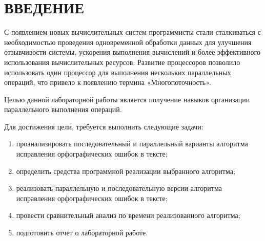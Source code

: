 \chapter*{\hfill{\centering ВВЕДЕНИЕ}\hfill}

С появлением новых вычислительных систем программисты стали сталкиваться с необходимостью проведения одновременной обработки данных для улучшения отзывчивости системы, ускорения выполнения вычислений и более эффективного использования вычислительных ресурсов.
Развитие процессоров позволило использовать один процессор для выполнения нескольких параллельных операций, что привело к появлению термина «Многопоточность».

Целью данной лабораторной работы является получение навыков организации параллельного выполнения операций.

Для достижения цели, требуется выполнить следующие задачи:
\begin{enumerate}[label={\arabic*)}]
	\item проанализировать последовательный и параллельный варианты алгоритма исправления орфографических ошибок в тексте;
	\item определить средства программной реализации выбранного алгоритма;
	\item реализовать параллельную и последовательную версии алгоритма исправления орфографических ошибок в тексте;
	\item провести сравнительный анализ по времени реализованного алгоритма;
	\item подготовить отчет о лабораторной работе.
\end{enumerate}